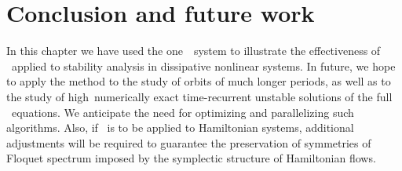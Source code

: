 \section{Conclusion and future work}
\label{sect:concl}

In this chapter
we have used the one\dmn\ \KS\ system to illustrate the effectiveness
of \ped\ applied to stability analysis
in dissipative nonlinear systems.
In future, we hope to apply the method to
the study of orbits of much longer
periods, as well as to the study of high\dmn\, numerically exact
time-recurrent unstable solutions of the full \NS\ equations.
We anticipate the need for
optimizing and parallelizing such algorithms.
Also, if \ped\ is to be applied to Hamiltonian systems, additional
adjustments will be required to guarantee the preservation of symmetries
of Floquet spectrum imposed by the symplectic structure of Hamiltonian
flows.
